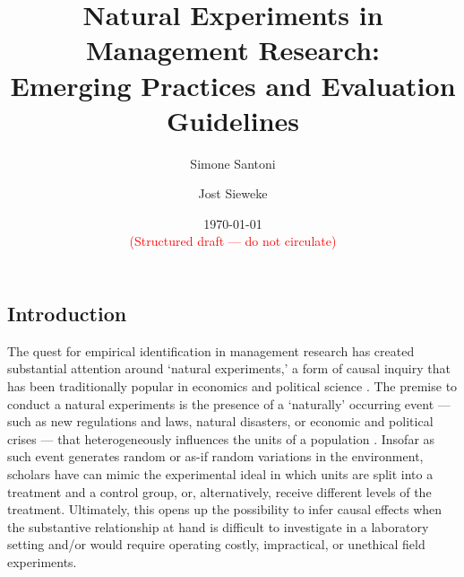 \documentclass[nobib]{tufte-handout}
\title[Natural Experiments in Management Research]
{Natural Experiments in Management Research:\\Emerging Practices and 
Evaluation Guidelines\vspace{2em}}
\author[$\bullet\circ$]{Simone Santoni}
\author[$\star$]{Jost Sieweke}
\affil[$\bullet$]{Bayes Business School (formerly Cass)}
\affil[$\circ$]{Soundcloud}
\affil[$\star$]{Vrije Universiteit Amsterdam}
\date{\vspace{1em} \normalsize \today \vspace{1em} \\ 
      \textcolor{red}{(Structured draft --- do not circulate)}}
\begin{document}
\maketitle

%
%
%

\clearpage

\begin{refsection}

\section{Introduction}
\label{introduction}


The quest for empirical identification in management research has created
substantial attention around `natural experiments,' a form of causal inquiry
that has been traditionally popular in economics
\parencite[][]{Meyer1995,Rosenzweig2000} and political science
\parencite[][]{Dunning2008}.  The premise to conduct a natural experiments is
the presence of a `naturally' occurring event --- such as new regulations and
laws, natural disasters, or economic and political crises --- that
heterogeneously influences the units of a population
\parencite[][]{Dunning2012,Robinson2009}. Insofar as such event generates random
or as-if random variations in the environment, scholars have can mimic the
experimental ideal in which units are split into a treatment and a control
group, or, alternatively, receive different levels of the treatment. Ultimately,
this opens up the possibility to infer causal effects when the substantive
relationship at hand is difficult to investigate in a laboratory setting and/or
would require operating costly, impractical, or unethical field experiments.



\end{refsection}
\end{document}
